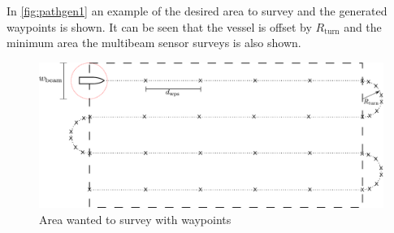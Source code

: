 In \autoref{fig:pathgen1} an example of the desired area to survey and the generated waypoints is shown. It can be seen that the vessel is offset by $R_\mathrm{turn}$ and the minimum area the  multibeam sensor surveys is also shown.
%
\begin{figure}[H]
  \includegraphics[width=1\textwidth]{figures/pathGen} 
  \caption{Area wanted to survey with waypoints}
  \label{fig:pathgen1}
\end{figure}   


